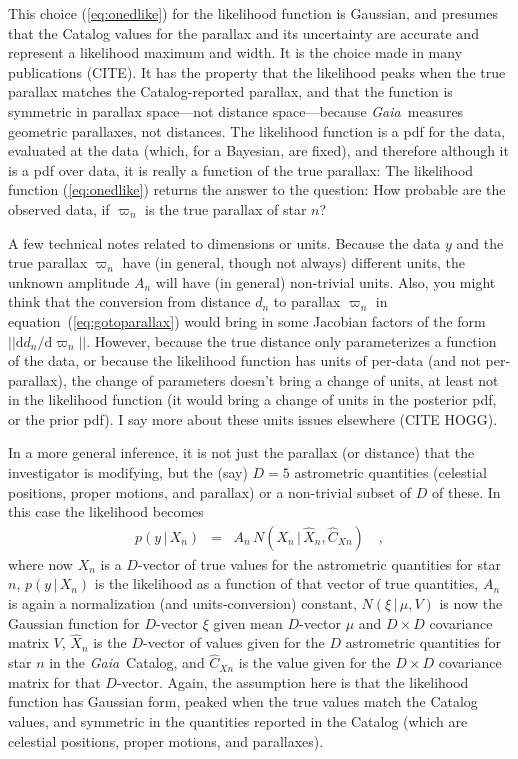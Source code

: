 \documentclass[12pt]{article}
\newcommand{\Gaia}{\textsl{Gaia}}
\newcommand{\equationname}{equation}
\newcommand{\dd}{\mathrm{d}}
\newcommand{\given}{\,|\,}
\begin{document}
This choice (\ref{eq:onedlike}) for the likelihood function is Gaussian,
and presumes that the
Catalog values for the parallax and its uncertainty are accurate and represent
a likelihood maximum and width.
It is the choice made in many publications (CITE).
It has the property that the likelihood peaks when the true parallax
matches the Catalog-reported parallax,
and that the function is symmetric in parallax space---not distance space---because
\Gaia\ measures geometric parallaxes, not distances.
The likelihood function is a pdf for the data, evaluated at the data (which,
for a Bayesian, are fixed), and therefore although it is a pdf over data,
it is really a function of the true parallax:
The likelihood function (\ref{eq:onedlike}) returns the answer to the question:
How probable are the observed data, if $\varpi_n$ is the true parallax of
star $n$?

A few technical notes related to dimensions or units.
Because the data $y$ and
the true parallax $\varpi_n$ have (in general, though not always) different units,
the unknown amplitude $A_n$ will have (in general) non-trivial units.
Also, you might think
that the conversion from distance $d_n$ to parallax $\varpi_n$
in \equationname~(\ref{eq:gotoparallax})
would bring in some Jacobian factors of the form $||\dd d_n/\dd\varpi_n||$.
However, because the true distance only parameterizes a function of the data,
or because the likelihood function has units of per-data (and not per-parallax),
the change of parameters doesn't bring a change of units, at least not in the
likelihood function (it would bring a change of units in the posterior pdf, or the
prior pdf).
I say more about these units issues elsewhere (CITE HOGG).

In a more general inference, it is not just the parallax (or distance)
that the investigator is modifying, but the (say) $D=5$ astrometric quantities
(celestial positions, proper motions, and parallax)
or a non-trivial subset of $D$ of these.
In this case the likelihood becomes
\begin{eqnarray}
p(y\given X_n) &=& A_n\,N(X_n\given\hat{X}_n,\hat{C}_{Xn})
\label{eq:like}
\quad ,
\end{eqnarray}
where now
$X_n$ is a $D$-vector of true values for the astrometric quantities for star $n$,
$p(y\given X_n)$ is the likelihood as a function of that vector of true quantities,
$A_n$ is again a normalization (and units-conversion) constant,
$N(\xi\given\mu,V)$ is now the Gaussian function for $D$-vector $\xi$ given mean $D$-vector $\mu$ and $D\times D$ covariance matrix $V$,
$\hat{X}_n$ is the $D$-vector of values given for the $D$ astrometric quantities for star $n$ in the \Gaia\ Catalog,
and $\hat{C}_{Xn}$ is the value given for the $D\times D$ covariance matrix for that
$D$-vector.
Again, the assumption here is that the likelihood function has Gaussian form, peaked
when the true values match the Catalog values, and symmetric in the quantities
reported in the Catalog (which are celestial positions, proper motions, and parallaxes).
\end{document}
